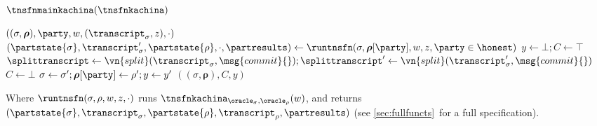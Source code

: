 \begin{transitionfnsketch}{$\tnsfnmainkachina(\tnsfnkachina)$}
  \vspace{-1em}
  \begin{receiveinput*}{$((\sigma, \boldsymbol\rho), \party, w,
      (\transcript_\sigma, z), \cdot)$}
    \State \Let $(\partstate{\sigma}, \transcript_\sigma', \partstate{\rho}, \cdot, \partresults) \gets
      \runtnsfn(\sigma, \boldsymbol\rho[\party], w, z, \party \in \honest)$
      \State \Let $y \gets \bot; C \gets \top$
      \State \Let $\splittranscript \gets
        \vn{split}(\transcript_\sigma, \msg{commit}{}); \splittranscript' \gets
        \vn{split}(\transcript_\sigma', \msg{commit}{})$
        \State \Let $C \gets \bot$
        \State \Break
      \EndIf
      \State \Let $\sigma \gets \sigma'; \boldsymbol\rho[\party] \gets \rho'; y
        \gets y'$
    \EndFor
    \State \Return $((\sigma, \boldsymbol\rho), C, y)$
  \end{receiveinput*}

  \noindent Where $\runtnsfn(\sigma, \rho, w, z, \cdot)$ runs
  $\tnsfnkachina_{\oracle_\sigma, \oracle_\rho}(w)$, and returns $(\partstate{\sigma},\allowbreak
  \transcript_\sigma,\allowbreak \partstate{\rho}, \transcript_\rho, \partresults)$ (see
  \iffull\autoref{sec:fullfuncts}\else\cite[Appendix~C]{fullversion}\fi\ for a full specification).
\end{transitionfnsketch}

